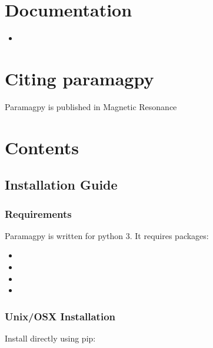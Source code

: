 \documentclass[a4paper,10pt,english,openany,oneside]{sphinxmanual}
\begin{document}
\chapter{Documentation}
\label{\detokenize{index:documentation}}\begin{itemize}
\item {} 

\end{itemize}


\chapter{Citing paramagpy}
\label{\detokenize{index:citing-paramagpy}}
Paramagpy is published in Magnetic Resonance 


\chapter{Contents}
\label{\detokenize{index:contents}}

\section{Installation Guide}
\label{\detokenize{install:installation-guide}}\label{\detokenize{install::doc}}

\subsection{Requirements}
\label{\detokenize{install:requirements}}
Paramagpy is written for python 3. It requires packages:
\begin{itemize}
\item {} 

\item {} 

\item {} 

\item {} 

\end{itemize}


\subsection{Unix/OSX Installation}
\label{\detokenize{install:unix-osx-installation}}
Install directly using pip:
\end{document}
